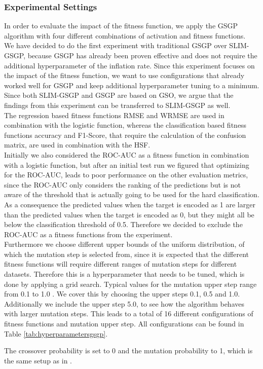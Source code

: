\documentclass[manuscript, review, anonymous]{acmart} %
\begin{document}
\subsubsection{Experimental Settings}
In order to evaluate the impact of the fitness function,
we apply the GSGP algorithm with four different
combinations of activation and fitness functions.\\
We have decided to do the first experiment
with traditional GSGP over SLIM-GSGP, because GSGP has already been proven effective and 
does not require the additional hyperparameter of the inflation rate. Since this experiment focuses 
on the impact of the fitness function, 
we want to use configurations that already worked well for GSGP 
and keep additional hyperparameter tuning to a minimum.
Since both SLIM-GSGP and GSGP are based on GSO, we argue that
the findings from this experiment can be transferred to SLIM-GSGP as well.\\
The regression based fitness
functions RMSE and WRMSE
are used in combination with the logistic function, whereas the
classification based fitness functions accuracy and F1-Score, that
require the calculation of the confusion matrix, are used in
combination with the HSF.\\
Initially we also considered the ROC-AUC
as a fitness function
in combination with a logistic function, but after an initial
test run we figured that optimizing for the ROC-AUC, leads
to poor
performance on the other evaluation metrics, since the ROC-AUC only
considers the ranking of the predictions but is not aware of
the threshold
that is actually going to be used for the hard classification.
As a consequence the predicted values when the target is
encoded as 1 are larger than the predicted values when
the target is encoded as 0,
but they might all be below the classification threshold of
0.5. Therefore we decided to exclude the ROC-AUC as a
fitness functions
from the experiment.\\
Furthermore we choose different upper bounds of the uniform distribution,
of which the mutation step is selected from,
since it is expected that the different fitness functions will
require different ranges of mutation steps for different datasets.
Therefore this is a hyperparameter that needs to be tuned,
which is done by applying a grid search. Typical values for the mutation upper step range from 0.1 to 1.0 \cite{Vanneschi2024}.
We cover this by choosing the upper steps 0.1, 0.5 and 1.0. Additionally we include the upper step 5.0, 
to see how the algorithm behaves with larger mutation steps.
This leads to a total of 16 different configurations of fitness functions and mutation upper step.
All configurations can be found in Table \ref{tab:hyperparametersgsgp}.

\noindent The crossover probability is set to 0 and the mutation
probability to 1, which is the same setup as in
\cite{Bakurov2022, Vanneschi2024}.
\end{document}
